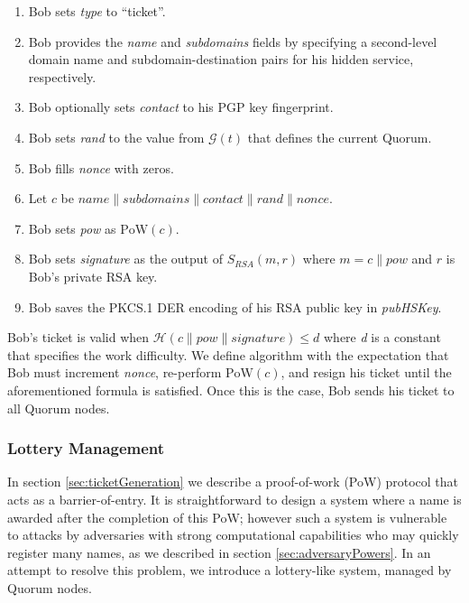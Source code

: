 \documentclass[USenglish,oneside,twocolumn]{article}
\newcommand*\concat{\mathbin{\|}}
\begin{document}
\begin{enumerate}
	\item Bob sets \emph{type} to ``ticket''.
	\item Bob provides the \emph{name} and \emph{subdomains} fields by specifying a second-level domain name and subdomain-destination pairs for his hidden service, respectively.
	\item Bob optionally sets \emph{contact} to his PGP key fingerprint.
	\item Bob sets \emph{rand} to the value from $ \mathcal{G}(t) $ that defines the current Quorum.
	\item Bob fills \emph{nonce} with zeros.
	\item Let $ \mathit{c} $ be $ \mathit{name} \concat \mathit{subdomains} \concat \mathit{contact} \concat \mathit{rand} \concat \mathit{nonce} $.
	\item Bob sets \emph{pow} as $ \mathrm{PoW}(\mathit{c}) $.
	\item Bob sets \emph{signature} as the output of $ S_{\mathit{RSA}}(m, r) $ where $ m = \mathit{c} \concat \mathit{pow} $ and $ r $ is Bob's private RSA key.
	\item Bob saves the PKCS.1 DER encoding of his RSA public key in \emph{pubHSKey}.
\end{enumerate}

Bob's ticket is valid when $ \mathcal{H}(\mathit{c} \concat \mathit{pow} \concat \mathit{signature}) \leq d $ where \emph{d} is a constant that specifies the work difficulty. We define algorithm with the expectation that Bob must increment \emph{nonce}, re-perform $ \mathrm{PoW}(\mathit{c}) $, and resign his ticket until the aforementioned formula is satisfied. Once this is the case, Bob sends his ticket to all Quorum nodes.

\subsubsection{Lottery Management} %

In section \ref{sec:ticketGeneration} we describe a proof-of-work (PoW) protocol that acts as a barrier-of-entry. It is straightforward to design a system where a name is awarded after the completion of this PoW; however such a system is vulnerable to attacks by adversaries with strong computational capabilities who may quickly register many names, as we described in section \ref{sec:adversaryPowers}. In an attempt to resolve this problem, we introduce a lottery-like system, managed by Quorum nodes.
\end{document}

